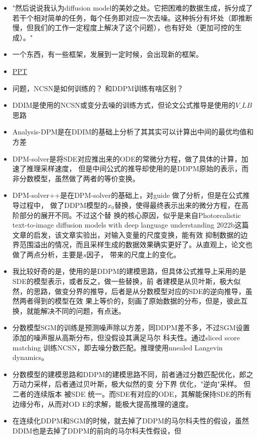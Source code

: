 \begin{itemize}
  \item "然后说说我认为diffusion model的美妙之处。它把困难的数据生成，拆分成了若干个相对简单的任务，每个任务即对应一次去噪。这种拆分有坏处（即推断慢，但我们的工作一定程度上解决了这个问题），也有好处（更加可控的生成）。"

  \item 一个东西，有一些框架，发展到一定时候，会出现新的框架。
  \item \href{https://ml.cs.tsinghua.edu.cn/~fanbao/Application-DPM.pdf}{PPT}
  \item 问题，NCSN是如何训练的？ 和DDPM训练有啥区别？
  \item DDIM是使用的NCSN或变分去噪的训练方式，但论文公式推导是使用的$V\_LB$思路
  \item Analysis-DPM是在DDIM的基础上分析了其其实可以计算出中间的最优均值和方差
  \item DPM-solver是将SDE对应推出来的ODE的常微分方程，做了具体的计算，加速了推理采样速度，
  但是中间公式的推导却使用的是DDPM原始的表示，而非分数模型，虽然做了两者的等价变换。
  \item DPM-solver++是在DPM-solver的基础上，对guide 做了分析，但是在公式推导过程中，
  做了DDPM模型的$x_0$替换，使得最终表示出来的微分方程，在高阶部分的展开不同。不过这个替
  换的核心原因，似乎是来自Photorealistic text-to-image diffusion models with deep
  language understanding 2022b这篇文章的启发，该文章实验出，对输入变量的尺度变换，能有效
  抑制数据的边界范围溢出的情况，而且采样生成的数据效果确实更好了。从直观上，论文也做了两点分析，主要是$s$因子，
  带来的尺度上的变化。
  \item 我比较好奇的是，使用的是DDPM的建模思路，但具体公式推导上采用的是SDE的模型表示，或者反之，做一些替换，前
  者建模是从贝叶斯，极大似然，的思路，做变分界的推导，后者是从分数模型对应的SDE的逆向推导，虽然两者得到的模型在效
  果上等价的，刻画了原始数据的分布，但是，彼此互换，就能解决不同的问题，有点迷。
  \item 分数模型SGM的训练是预测噪声除以方差，同DDPM差不多，不过SGM设置添加的噪声服从高斯分布，但没假设其满足马尔
  科夫性。通过sliced score matching 训练NCSN，即去噪分数匹配。推理使用nnealed Langevin dynamics。
  \item 分数模型的建模思路和DDPM的建模思路不同，前者通过分数匹配优化，郎之万动力采样，后者通过贝叶斯，极大似然的变
  分下界 优化，"逆向"采样。 但二者的连续版本 被SDE 统一。而SDE有对应的ODE，其解能保持SDE的所有边缘分布，从而对OD
  E的求解，能极大提高推理的速度。
  \item 在连续化DDPM和SGM的时候，就去掉了DDPM的马尔科夫性的假设，虽然DDIM也是去掉了DDPM的前向的马尔科夫性假设，但

\end{itemize}
